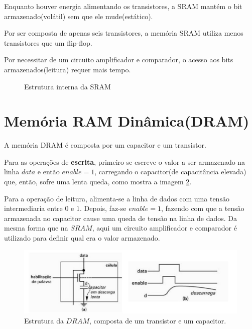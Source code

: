 \documentclass{article}
\begin{document}
Enquanto houver energia alimentando os transistores, a SRAM mantém o bit armazenado(volátil) sem que ele mude(estático).

Por ser composta de apenas seis transistores, a memória SRAM utiliza menos transistores que um flip-flop.

Por necessitar de um circuito amplificador e comparador, o acesso aos bits armazenados(leitura) requer mais tempo.
 
\begin{figure}[!h]
     \centering
     \def\svgwidth{0.5\textwidth}
     
     \caption{\label{fig:img1} Estrutura interna da SRAM }
     \hfill
\end{figure}



\newpage

\section{Memória RAM Dinâmica(DRAM)}

A memória DRAM é composta por um capacitor e um transistor.


Para as operações de \textbf{escrita}, primeiro se escreve o valor a ser armazenado na linha $data$ e então $enable=1$, carregando o capacitor(de capacitância elevada) que, então, sofre uma lenta queda, como mostra a imagem \ref{fig:estruturaDRam}.


Para a operação de leitura, alimenta-se a linha de dados com uma tensão intermediaria entre $0$ e $1$. Depois, faz-se $enable=1$, fazendo com que a tensão armazenada no capacitor cause uma queda de tensão na linha de dados. Da mesma forma que na $SRAM$, aqui um circuito amplificador e comparador é utilizado para definir qual era o valor armazenado.
\begin{figure}[h!] 
    \centering 
    \includegraphics[width=1\textwidth]{estruturaDRam.jpg}
    \caption{Estrutura da $DRAM$, composta de um transistor e um capacitor.} 
    \label{fig:estruturaDRam} 
\end{figure}
\end{document}

